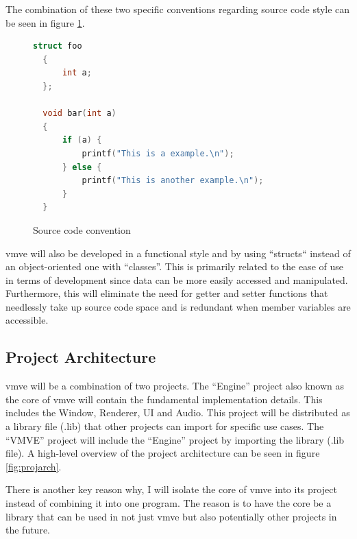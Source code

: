 \documentclass[11pt]{article}
\begin{document}
The combination of these two specific conventions regarding source code style
can be seen in figure \ref{fig:convention}.

\begin{figure}[ht]
\centering
\begin{lstlisting}[language=C++]
  struct foo
  {
      int a;
  };

  void bar(int a)
  {
      if (a) {
          printf("This is a example.\n");
      } else {
          printf("This is another example.\n");
      }
  }
\end{lstlisting}
\caption{Source code convention}
\label{fig:convention}
\end{figure}

\gls*{vmve} will also be developed in a functional style and by using ``structs``
instead of an object-oriented one with ``classes''. This is primarily related to
the ease of use in terms of development since data can be more easily accessed
and manipulated. Furthermore, this will eliminate the need for getter and setter
functions that needlessly take up source code space and is redundant when member
variables are accessible.

\subsection{Project Architecture}

\gls*{vmve} will be a combination of two projects. The ``Engine'' project also
known as the core of \gls*{vmve} will contain the fundamental implementation
details. This includes the Window, Renderer, UI and Audio. This project will be
distributed as a library file (.lib) that other projects can import for specific
use cases. The ``VMVE'' project will include the ``Engine'' project by importing
the library (.lib file). A high-level overview of the project architecture can
be seen in figure \ref{fig:projarch}.

There is another key reason why, I will isolate the core of \gls*{vmve} into its
project instead of combining it into one program. The reason is to have the core
be a library that can be used in not just \gls*{vmve} but also potentially other
projects in the future.
\end{document}
